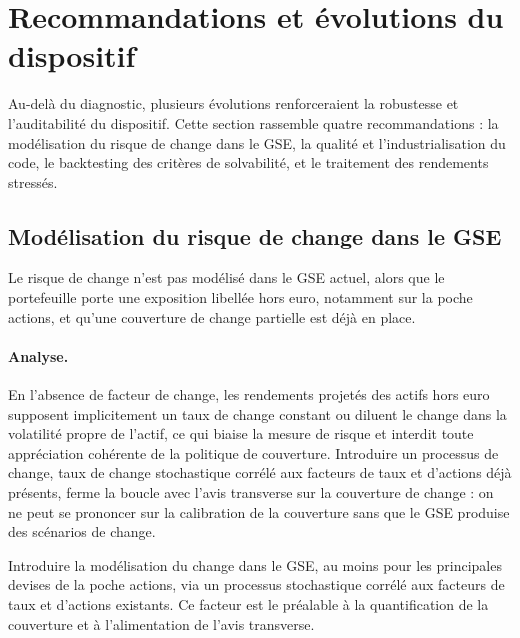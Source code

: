 \documentclass[11pt,a4paper]{article}
\begin{document}
\section{Recommandations et évolutions du dispositif}

Au-delà du diagnostic, plusieurs évolutions renforceraient la robustesse et l'auditabilité du dispositif. Cette section rassemble quatre recommandations : la modélisation du risque de change dans le GSE, la qualité et l'industrialisation du code, le backtesting des critères de solvabilité, et le traitement des rendements stressés.

\subsection{Modélisation du risque de change dans le GSE}

Le risque de change n'est pas modélisé dans le GSE actuel, alors que le portefeuille porte une exposition libellée hors euro, notamment sur la poche actions, et qu'une couverture de change partielle est déjà en place.

\paragraph{Analyse.} En l'absence de facteur de change, les rendements projetés des actifs hors euro supposent implicitement un taux de change constant ou diluent le change dans la volatilité propre de l'actif, ce qui biaise la mesure de risque et interdit toute appréciation cohérente de la politique de couverture. Introduire un processus de change, taux de change stochastique corrélé aux facteurs de taux et d'actions déjà présents, ferme la boucle avec l'avis transverse sur la couverture de change : on ne peut se prononcer sur la calibration de la couverture sans que le GSE produise des scénarios de change.

\begin{mabox}
Introduire la modélisation du change dans le GSE, au moins pour les principales devises de la poche actions, via un processus stochastique corrélé aux facteurs de taux et d'actions existants. Ce facteur est le préalable à la quantification de la couverture et à l'alimentation de l'avis transverse.
\end{mabox}
\end{document}
